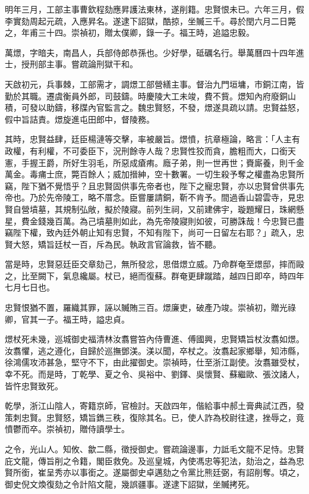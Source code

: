 \begin{pinyinscope}
明年三月，工部主事曹欽程劾應昇護法東林，遂削籍。忠賢恨未已。六年三月，假李實劾周起元疏，入應昇名。遂逮下詔獄，酷掠，坐贓三千。尋於閏六月二日斃之，年甫三十四。崇禎初，贈太僕卿，錄一子。福王時，追謚忠毅。

萬燝，字暗夫，南昌人，兵部侍郎恭孫也。少好學，砥礪名行。舉萬曆四十四年進士，授刑部主事。嘗疏論刑獄干和。

天啟初元，兵事棘，工部需才，調燝工部營繕主事。督治九門垣墉，市銅江南，皆勤於其職。遷虞衡員外郎，司鼓鑄。時慶陵大工未竣，費不貲。燝知內府廢銅山積，可發以助鑄，移牒內官監言之。魏忠賢怒，不發，燝遂具疏以請。忠賢益怒，假中旨詰責。燝旋進屯田郎中，督陵務。

其時，忠賢益肆，廷臣楊漣等交擊，率被嚴旨。燝憤，抗章極論，略言：「人主有政權，有利權，不可委臣下，況刑餘寺人哉？忠賢性狡而貪，膽粗而大，口銜天憲，手握王爵，所好生羽毛，所惡成瘡痏。廕子弟，則一世再世；賚廝養，則千金萬金。毒痡士庶，斃百餘人；威加搢紳，空十數署。一切生殺予奪之權盡為忠賢所竊，陛下猶不覺悟乎？且忠賢固供事先帝者也，陛下之寵忠賢，亦以忠賢曾供事先帝也。乃於先帝陵工，略不厝念。臣嘗屢請銅，靳不肯予。間過香山碧雲寺，見忠賢自營墳墓，其規制弘敞，擬於陵寢。前列生祠，又前建佛宇，璇題耀日，珠網懸星，費金錢幾百萬。為己墳墓則如此，為先帝陵寢則如彼，可勝誅哉！今忠賢已盡竊陛下權，致內廷外朝止知有忠賢，不知有陛下，尚可一日留左右耶？」疏入，忠賢大怒，矯旨廷杖一百，斥為民。執政言官論救，皆不聽。

當是時，忠賢惡廷臣交章劾己，無所發忿，思借燝立威。乃命群奄至燝邸，摔而毆之，比至闕下，氣息纔屬。杖已，絕而復蘇。群奄更肆蹴踏，越四日即卒，時四年七月七日也。

忠賢恨猶不置，羅織其罪，誣以贓賄三百。燝廉吏，破產乃竣。崇禎初，贈光祿卿，官其一子。福王時，謚忠貞。

燝杖死未幾，巡城御史福清林汝翥嘗笞內侍曹進、傅國興，忠賢矯旨杖汝翥如燝。汝翥懼，逃之遵化，自歸於巡撫鄧渼。渼以聞，卒杖之。汝翥起家鄉舉，知沛縣，徐鴻儒攻沛甚急，堅守不下，由此擢御史。崇禎時，仕至浙江副使。汝翥雖受杖，幸不死。而是時，丁乾學、夏之令、吳裕中、劉鐸、吳懷賢、蘇繼歐、張汶諸人，皆忤忠賢致死。

乾學，浙江山陰人，寄籍京師，官檢討。天啟四年，偕給事中郝土膏典試江西，發策刺忠賢。忠賢怒，矯旨鐫三秩，復除其名。已，使人詐為校尉往逮，挫辱之，竟憤鬱而卒。崇禎初，贈侍讀學士。

之令，光山人。知攸、歙二縣，徵授御史。嘗疏論邊事，力詆毛文龍不足恃。忠賢庇文龍，傳旨削之令籍，閣臣救免。及巡皇城，內使馮忠等犯法，劾治之，益為忠賢所銜，崔呈秀亦以事銜之。遂屬御史卓邁劾之令黨比熊廷弼，有詔削奪。頃之，御史倪文煥復劾之令計陷文龍，幾誤疆事。遂逮下詔獄，坐贓拷死。


\end{pinyinscope}
